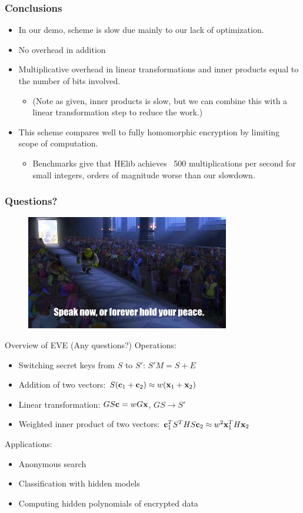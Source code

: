 \documentclass{beamer}
\newcommand{\itz}[1]{\begin{itemize}#1\end{itemize}} %
\newcommand{\bbc}{{\bf c}} %
\newcommand{\bbx}{{\bf x}} %
\begin{document}
\begin{frame}
\frametitle{Conclusions}
\itz{
\item{In our demo, scheme is slow due mainly to our lack of optimization.}
\vspace{.1in}
\item{No overhead in addition}
\item{Multiplicative overhead in linear transformations and inner products equal to the number of bits involved.
	\itz{
		\item{(Note as given, inner products is slow, but we can combine this with a linear transformation step to reduce the work.)}
	}
}
\vspace{.1in}
\item{This scheme compares well to fully homomorphic encryption by limiting scope of computation.
	\itz{
		\item{Benchmarks give that HElib achieves ~500 multiplications per second for small integers, orders of magnitude worse than our slowdown.}
	}
}
}
\end{frame}


\begin{frame}
\frametitle{Questions?}
\begin{figure}[ht]
\centering
\includegraphics[width=3.5in]{questions}
\end{figure}
\end{frame}


\begin{frame}{Overview of EVE  (Any questions?)}
Operations:
\itz{
\item{Switching secret keys from $S$ to $S'$: $S'M = S + E$}
\item{Addition of two vectors: $S(\bbc_1 + \bbc_2) \approx w(\bbx_1 + \bbx_2)$}
\item{Linear transformation: $GS\bbc = wG\bbx$, $GS \rightarrow S'$}
\item{Weighted inner product of two vectors: $\bbc_1^T S^T H S \bbc_2 \approx w^2 \bbx_1^T H \bbx_2$}
}
Applications:
\itz{
\item{Anonymous search}
\item{Classification with hidden models}
\item{Computing hidden polynomials of encrypted data}
}
\end{frame}
\end{document}
